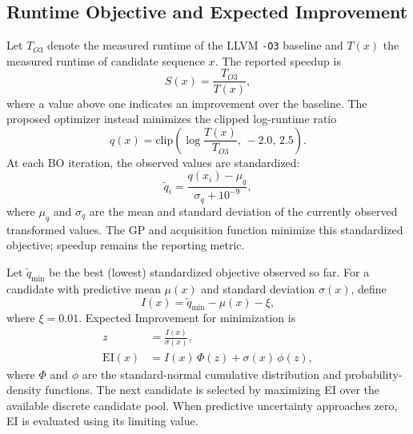 

\subsection{Runtime Objective and Expected Improvement}
Let $T_{O3}$ denote the measured runtime of the LLVM \texttt{-O3} baseline and $T(x)$ the measured runtime of candidate sequence $x$. The reported speedup is
\begin{equation}
S(x) = \frac{T_{O3}}{T(x)},
\end{equation}
where a value above one indicates an improvement over the baseline. The proposed optimizer instead minimizes the clipped log-runtime ratio
\begin{equation}
q(x) = \mathrm{clip}\!\left(\log\frac{T(x)}{T_{O3}},\, -2.0,\, 2.5\right).
\end{equation}
At each BO iteration, the observed values are standardized:
\begin{equation}
\tilde{q}_i = \frac{q(x_i) - \mu_q}{\sigma_q + 10^{-9}},
\end{equation}
where $\mu_q$ and $\sigma_q$ are the mean and standard deviation of the currently observed transformed values. The GP and acquisition function minimize this standardized objective; speedup remains the reporting metric.

Let $\tilde{q}_{\min}$ be the best (lowest) standardized objective observed so far. For a candidate with predictive mean $\mu(x)$ and standard deviation $\sigma(x)$, define
\begin{equation}
I(x) = \tilde{q}_{\min} - \mu(x) - \xi,
\end{equation}
where $\xi = 0.01$. Expected Improvement for minimization is
\begin{align}
z &= \frac{I(x)}{\sigma(x)}, \\
\mathrm{EI}(x) &= I(x)\,\Phi(z) + \sigma(x)\,\phi(z),
\end{align}
where $\Phi$ and $\phi$ are the standard-normal cumulative distribution and probability-density functions. The next candidate is selected by maximizing EI over the available discrete candidate pool. When predictive uncertainty approaches zero, EI is evaluated using its limiting value.

